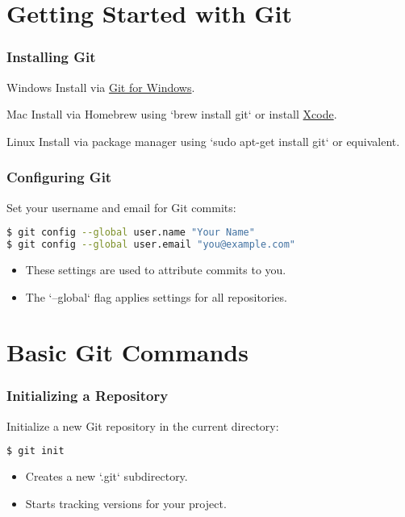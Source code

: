 \documentclass{beamer}
\begin{document}
\section{Getting Started with Git}

\begin{frame}
  \frametitle{Installing Git}
  \begin{block}{Windows}
    Install via \href{https://git-scm.com/download/win}{Git for Windows}.
  \end{block}
  \begin{block}{Mac}
    Install via Homebrew using `brew install git` or install \href{https://developer.apple.com/xcode/}{Xcode}.
  \end{block}
  \begin{block}{Linux}
    Install via package manager using `sudo apt-get install git` or equivalent.
  \end{block}
\end{frame}

\begin{frame}[fragile]
  \frametitle{Configuring Git}
  Set your username and email for Git commits:
  \begin{lstlisting}[language=bash]
$ git config --global user.name "Your Name"
$ git config --global user.email "you@example.com"
  \end{lstlisting}
  \begin{itemize}
    \item These settings are used to attribute commits to you.
    \item The `--global` flag applies settings for all repositories.
  \end{itemize}
\end{frame}

\section{Basic Git Commands}

\begin{frame}[fragile]
  \frametitle{Initializing a Repository}
  Initialize a new Git repository in the current directory:
  \begin{lstlisting}[language=bash]
$ git init
  \end{lstlisting}
  \begin{itemize}
    \item Creates a new `.git` subdirectory.
    \item Starts tracking versions for your project.
  \end{itemize}
\end{frame}
\end{document}
